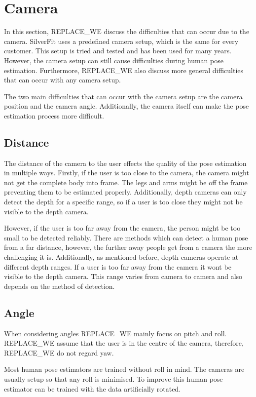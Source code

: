 \section{Camera}

In this section, REPLACE_WE discuss the difficulties that can occur due to the camera. SilverFit uses a predefined camera setup, which is the same for every customer. This setup is tried and tested and has been used for many years. However, the camera setup can still cause difficulties during human pose estimation. Furthermore, REPLACE_WE also discuss more general difficulties that can occur with any camera setup.

The two main difficulties that can occur with the camera setup are the camera position and the camera angle. Additionally, the camera itself can make the pose estimation process more difficult.

\subsection{Distance}

The distance of the camera to the user effects the quality of the pose estimation in multiple ways. Firstly, if the user is too close to the camera, the camera might not get the complete body into frame. The legs and arms might be off the frame preventing them to be estimated properly. Additionally, depth cameras can only detect the depth for a specific range, so if a user is too close they might not be visible to the depth camera.

However, if the user is too far away from the camera, the person might be too small to be detected reliably. There are methods which can detect a human pose from a far distance, however, the further away people get from a camera the more challenging it is. Additionally, as mentioned before, depth cameras operate at different depth ranges. If a user is too far away from the camera it wont be visible to the depth camera. This range varies from camera to camera and also depends on the method of detection.

\subsection{Angle}

When considering angles REPLACE_WE mainly focus on pitch and roll. REPLACE_WE assume that the user is in the centre of the camera, therefore, REPLACE_WE do not regard yaw.

Most human pose estimators are trained without roll in mind. The cameras are usually setup so that any roll is minimised. To improve this human pose estimator can be trained with the data artificially rotated.


